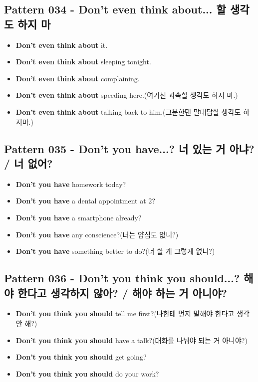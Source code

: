 \documentclass[11pt]{oblivoir}
\begin{document}
\subsection{Pattern 034 - Don't even think about... \texttildelow 할 생각도 하지 마}
\begin{itemize}
  \item \textbf{Don't even think about} it.
  \item \textbf{Don't even think about} sleeping tonight.
  \item \textbf{Don't even think about} complaining.
  \item \textbf{Don't even think about} speeding here.(여기선 과속할 생각도 하지 마.)
  \item \textbf{Don't even think about} talking back to him.(그분한텐 말대답할 생각도 하지마.)
\end{itemize}

\subsection{Pattern 035 - Don't you have...? 너 \texttildelow 있는 거 아냐? / 너 \texttildelow 없어?}
\begin{itemize}
  \item \textbf{Don't you have} homework today?
  \item \textbf{Don't you have} a dental appointment at 2?
  \item \textbf{Don't you have} a smartphone already?
  \item \textbf{Don't you have} any conscience?(너는 얌심도 없니?)
  \item \textbf{Don't you have} something better to do?(너 할 게 그렇게 없니?)
\end{itemize}

\subsection{Pattern 036 - Don't you think you should...? \texttildelow 해야 한다고 생각하지 않아? / \texttildelow 해야 하는 거 아니야?}
\begin{itemize}
  \item \textbf{Don't you think you should} tell me first?(나한테 먼저 말해야 한다고 생각 안 해?)
  \item \textbf{Don't you think you should} have a talk?(대화를 나눠야 되는 거 아니야?)
  \item \textbf{Don't you think you should} get going?
  \item \textbf{Don't you think you should}  do your work?
\end{itemize}
\end{document}
